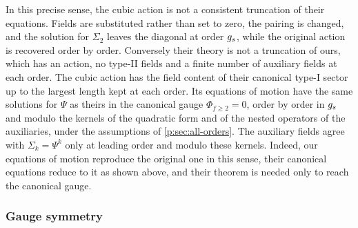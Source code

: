 In this precise sense, the cubic action is not a consistent truncation of their equations.
Fields are substituted rather than set to zero, the pairing is changed, and the solution for $\Sigma_2$ leaves the diagonal at order $g_s$, while the original action is recovered order by order.
Conversely their theory is not a truncation of ours, which has an action, no type-II fields and a finite number of auxiliary fields at each order.
The cubic action has the field content of their canonical type-I sector up to the largest length kept at each order.
Its equations of motion have the same solutions for $\Psi$ as theirs in the canonical gauge $\Phi_{f \ge 2} = 0$, order by order in $g_s$ and modulo the kernels of the quadratic form and of the nested operators of the auxiliaries, under the assumptions of \cref{p:sec:all-orders}. The auxiliary fields agree with $\Sigma_k = \Psi^k$ only at leading order and modulo these kernels.
Indeed, our equations of motion reproduce the original one in this sense, their canonical equations reduce to it as shown above, and their theorem is needed only to reach the canonical gauge.

\subsubsection{Gauge symmetry}
\label{p:sec:barcobar:gauge}

